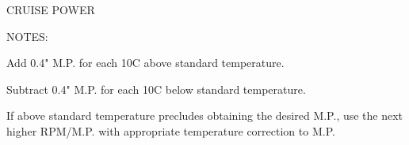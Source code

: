 \settowidth{\colOne}{PRESSURE}
\settowidth{\colTwo}{FLOW}
\settowidth{\colThree}{BEST POWER}

\begin{sidewaysfigure}[t]
\begin{center}
\begin{perfhdr}CRUISE POWER
\end{perfhdr}
\begin{minipage}{9in}
\begin{minipage}{5in}
NOTES:
\begin{enumerate*}
\item Add 0.4" M.P. for each 10\textdegree C above standard temperature.  
\item Subtract 0.4" M.P. for each 10\textdegree C below standard temperature.
\item If above standard temperature precludes obtaining the desired M.P., use the next higher RPM/M.P. with appropriate temperature correction to M.P.
\end{enumerate*}


\end{minipage}
\end{minipage}
\end{center}
\end{sidewaysfigure}
